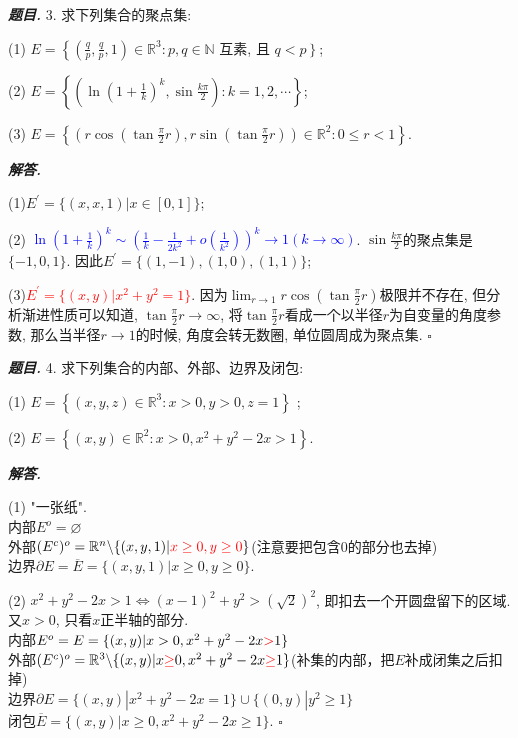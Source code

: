 \documentclass[10pt, a4paper, oneside]{ctexart}
\newenvironment{problem}{\begin{framed}\par\noindent\textbf{\textit{题目. }}}{\end{framed}\par}
\newenvironment{solution}{%
  \par\noindent\textbf{\textit{解答. }}\ignorespaces
}{%
  \hfill\ensuremath{\square}\par %
}
\begin{document}
\begin{problem}
3. 求下列集合的聚点集:

(1) $E=\left\{\left(\frac{q}{p}, \frac{q}{p}, 1\right) \in \mathbb{R}^3: p, q \in \mathbb{N}\right.$ 互素, 且 $\left.q<p\right\}$;

(2) $E=\left\{\left(\ln \left(1+\frac{1}{k}\right)^k, \sin \frac{k \pi}{2}\right): k=1,2, \cdots\right\}$;

(3) $E=\left\{\left(r \cos \left(\tan \frac{\pi}{2} r\right), r \sin \left(\tan \frac{\pi}{2} r\right)\right) \in \mathbb{R}^2: 0 \leqslant r<1\right\}$.
\end{problem}
\begin{solution}
    (1)$E^{\prime}=\{(x,x,1)|x\in[0,1]\}$;

    (2) \textcolor{blue}{$\ln(1+\frac{1}{k})^k \sim (\frac{1}{k}-\frac{1}{2k^2}+o(\frac{1}{k^2}))^k \to 1(k\to \infty)$}. $\sin \frac{k\pi}{2}$的聚点集是$\{-1,0,1\}$. 因此$E^{\prime}=\{(1,-1),(1,0),(1,1)\}$;

    (3)\textcolor{red}{$E^{\prime}=\{(x,y)|x^2+y^2=1\}$}. 因为$\lim_{r\to 1}r\cos(\tan\frac{\pi}{2}r)$极限并不存在, 但分析渐进性质可以知道, $\tan\frac{\pi}{2}r\to \infty$, 将$\tan\frac{\pi}{2}r$看成一个以半径$r$为自变量的角度参数, 那么当半径$r\to 1$的时候, 角度会转无数圈, 单位圆周成为聚点集.
\end{solution}

\begin{problem}
4. 求下列集合的内部、外部、边界及闭包:

(1) $E=\left\{(x, y, z) \in \mathbb{R}^3: x>0, y>0, z=1\right\}$ ;

(2) $E=\left\{(x, y) \in \mathbb{R}^2: x>0, x^2+y^2-2 x>1\right\}$.
\end{problem}
\begin{solution}
    (1) "一张纸".\\内部$E^{o}=\varnothing$\\外部$(E^{c})^{o}=\mathbb{R}^n \backslash \{(x,y,1)|\textcolor{red}{x\geq 0 , y\geq 0}\}$(注意要把包含$0$的部分也去掉)\\边界$\partial E= \overline{E} = \{(x,y,1)|x\geq 0, y\geq 0\}$.

    (2) $x^2+y^2-2x>1\iff (x-1)^2+y^2>(\sqrt{2})^2$, 即扣去一个开圆盘留下的区域. 又$x>0$, 只看$x$正半轴的部分.\\内部$E^{o}=E=\{(x,y)|x>0, x^2+y^2-2x\textcolor{red}{>} 1\}$\\外部$(E^{c})^{o}=\mathbb{R}^3\backslash \{(x,y)|x\textcolor{red}{\geq}0,x^2+y^2-2x\textcolor{red}{\geq}1\}$(补集的内部，把$E$补成闭集之后扣掉)\\边界$\partial E=\{(x,y)|x^2+y^2-2x=1\}\cup \{(0,y)|y^2\geq 1\}$\\闭包$\overline{E}=\{(x,y)|x\geq 0, x^2+y^2-2x\geq 1\}$.
\end{solution}
\end{document}

